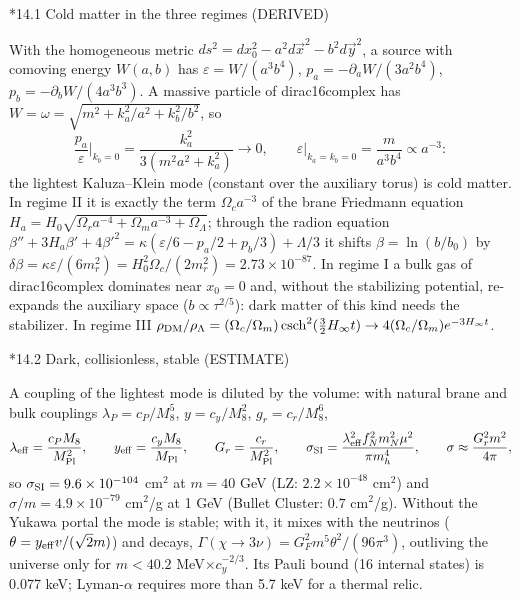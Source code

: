 \documentclass[10pt,a4paper]{article}
\makeatletter
\renewcommand\subsection{\@startsection{subsection}{2}{\z@}{-3.25ex\@plus -1ex \@minus -.2ex}{1.5ex \@plus .2ex}{\normalfont\large\bfseries\raggedright}}
\makeatother
\begin{document}
\subsection*{14.1 Cold matter in the three regimes (DERIVED)}
With the homogeneous metric $ds^2=dx_0^2-a^2d\vec x^2-b^2d\vec y^2$, a source with comoving energy $W(a,b)$ has $\varepsilon=W/(a^3b^4)$, $p_a=-\partial_aW/(3a^2b^4)$, $p_b=-\partial_bW/(4a^3b^3)$. A massive particle of dirac16complex has $W=\omega=\sqrt{m^2+k_a^2/a^2+k_b^2/b^2}$, so
\begin{equation*}
\frac{p_a}{\varepsilon}\Big|_{k_b=0}=\frac{k_a^2}{3(m^2a^2+k_a^2)}\to0,\qquad \varepsilon\big|_{k_a=k_b=0}=\frac m{a^3b^4}\propto a^{-3}:
\end{equation*}
the lightest Kaluza–Klein mode (constant over the auxiliary torus) is cold matter. In regime II it is exactly the term $\Omega_ca^{-3}$ of the brane Friedmann equation $H_a=H_0\sqrt{\Omega_ra^{-4}+\Omega_ma^{-3}+\Omega_\Lambda}$; through the radion equation $\beta''+3H_a\beta'+4\beta'^2=\kappa(\varepsilon/6-p_a/2+p_b/3)+\Lambda/3$ it shifts $\beta=\ln(b/b_0)$ by $\delta\beta=\kappa\varepsilon/(6m_r^2)=H_0^2\Omega_c/(2m_r^2)=2.73\times10^{-87}$. In regime I a bulk gas of dirac16complex dominates near $x_0=0$ and, without the stabilizing potential, re-expands the auxiliary space ($b\propto\tau^{2/5}$): dark matter of this kind needs the stabilizer. In regime III $\rho_{\rm DM}/\rho_\Lambda=(\Omega_c/\Omega_m)\,\mathrm{csch}^2(\frac32H_\infty t)\to4(\Omega_c/\Omega_m)e^{-3H_\infty t}$.

\subsection*{14.2 Dark, collisionless, stable (ESTIMATE)}
A coupling of the lightest mode is diluted by the volume: with natural brane and bulk couplings $\lambda_P=c_P/M_8^5$, $y=c_y/M_8^2$, $g_r=c_r/M_8^6$,
\begin{equation*}
\lambda_{\rm eff}=\frac{c_PM_8}{M_{\rm Pl}^2},\qquad y_{\rm eff}=\frac{c_yM_8}{M_{\rm Pl}},\qquad G_r=\frac{c_r}{M_{\rm Pl}^2},\qquad \sigma_{\rm SI}=\frac{\lambda_{\rm eff}^2f_N^2m_N^2\mu^2}{\pi m_h^4},\qquad \sigma\approx\frac{G_r^2m^2}{4\pi},
\end{equation*}
so $\sigma_{\rm SI}=9.6\times10^{-104}$ cm$^2$ at $m=40$ GeV (LZ: $2.2\times10^{-48}$ cm$^2$) and $\sigma/m=4.9\times10^{-79}$ cm$^2$/g at 1 GeV (Bullet Cluster: $0.7$ cm$^2$/g). Without the Yukawa portal the mode is stable; with it, it mixes with the neutrinos ($\theta=y_{\rm eff}v/(\sqrt2m)$) and decays, $\Gamma(\chi\to3\nu)=G_F^2m^5\theta^2/(96\pi^3)$, outliving the universe only for $m<40.2$ MeV$\times c_y^{-2/3}$. Its Pauli bound (16 internal states) is 0.077 keV; Lyman-$\alpha$ requires more than 5.7 keV for a thermal relic.
\end{document}
